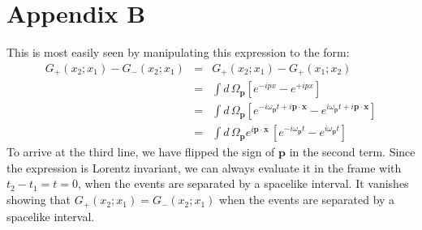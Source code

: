 \documentclass{article}
\begin{document}
\section{Appendix B}
\label{sec:equalgs}
This is most easily seen by manipulating this expression to the form:
\begin{eqnarray}
\label{delta}
G_+(x_2;x_1) - G_-(x_2;x_1) &=&
 G_+(x_2;x_1) - G_+(x_1;x_2)\\
 &=&\int d\,\Omega_{\bm{p}} [e^{-ipx} - e^{+ipx}]\\
&=&\int d\,\Omega_{\bm{p}} [ e^{-i\omega_{\bm{p}} t+ i\bm{p\cdot x}} -  e^{i\omega_{\bm{p}} t+ i\bm{p\cdot x}}]\nonumber\\
&=&\int d\,\Omega_{\bm{p}} e^{i\bm{p\cdot x}}\, [e^{-i\omega_{\bm{p}} t} - e^{i\omega_{\bm{p}} t}]\nonumber
\end{eqnarray} 
To arrive at the third line, we have flipped the sign of $\bm p$ in the second term.
Since the expression is  Lorentz invariant, we can always evaluate it in the frame with $t_2-t_1=t=0$, when the events are separated by a spacelike interval. It vanishes showing that $G_+(x_2;x_1) = G_-(x_2;x_1)$ when the events are separated by a spacelike interval.
\end{document}
